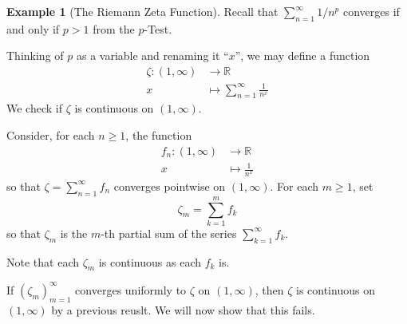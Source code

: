 \documentclass[11pt]{article}
\theoremstyle{definition}
\newtheorem{exmp}[thm]{Example}
\newcommand{\mbR}{\ensuremath{\mathbb{R}}}
\begin{document}
\begin{exmp}[The Riemann Zeta Function]
Recall that $\sum_{n=1}^\infty 1/n^p$ converges if and only if $p > 1$ from the $p$-Test. 

Thinking of $p$ as a variable and renaming it ``$x$'', we may define a function
\begin{align*}
\zeta : (1, \infty) & \to \mbR \\
x & \mapsto \sum_{n=1}^\infty \frac{1}{n^x}
\end{align*}
We check if $\zeta$ is continuous on $(1, \infty)$.

Consider, for each $n \geq 1$, the function
\begin{align*}
f_n : (1, \infty) & \to \mbR \\
x & \mapsto \frac{1}{n^x}
\end{align*}
so that $\zeta = \sum_{n=1}^\infty f_n$ converges pointwise on $(1, \infty)$. For each $m \geq 1$, set
$$\zeta_m = \sum_{k=1}^m f_k$$
so that $\zeta_m$ is the $m$-th partial sum of the series $\sum_{k=1}^\infty f_k$.

Note that each $\zeta_m$ is continuous as each $f_k$ is.

If $(\zeta_m)_{m=1}^\infty$ converges uniformly to $\zeta$ on $(1, \infty)$, then $\zeta$ is continuous on $(1, \infty)$ by a previous reuslt. We will now show that this fails.


\end{exmp}
\end{document}
